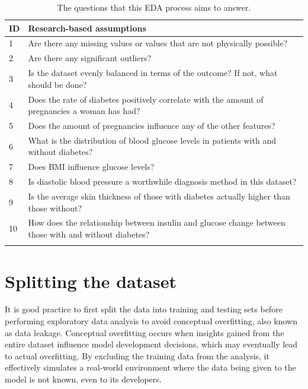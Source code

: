 \documentclass[12pt]{report}
\begin{document}
\begin{longtable}{ | p{} | p{} | }
    \hline
    \cellcolor{blue!25} ID & \cellcolor{blue!25} Research-based assumptions \\
    \hline
    1 & Are there any missing values or values that are not physically possible?\\
    \hline
    2 & Are there any significant outliers?\\
    \hline 
    3 & Is the dataset evenly balanced in terms of the outcome? If not, what should be done?\\
    \hline 
    4 & Does the rate of diabetes positively correlate with the amount of pregnancies a woman has had?\\
    \hline
    5 & Does the amount of pregnancies influence any of the other features?\\
    \hline
    6 & What is the distribution of blood glucose levels in patients with and without diabetes?\\
    \hline
    7 & Does BMI influence glucose levels?\\
    \hline
    8 & Is diastolic blood pressure a worthwhile diagnosis method in this dataset?\\
    \hline
    9 & Is the average skin thickness of those with diabetes actually higher than those without?\\
    \hline
    10 & How does the relationship between insulin and glucose change between those with and without diabetes?\\
    \hline
    \caption{The questions that this EDA process aims to answer.}\label{tab:Questions}
\end{longtable}
\pagebreak

\section{Splitting the dataset}
It is good practice to first split the data into training and testing sets before performing exploratory data analysis
to avoid conceptual overfitting, also known as data leakage. Conceptual overfitting occurs when insights gained from the entire dataset 
influence model development decisions, which may eventually lead to actual overfitting. By excluding the training data from the analysis,
it effectively simulates a real-world environment where the data being given to the model is not known, even to its developers.
\end{document}
